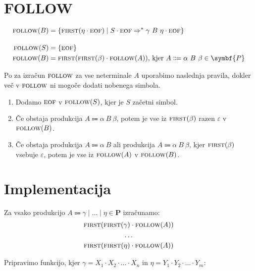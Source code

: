 \documentclass{report}
\newcommand{\Null}{\varepsilon}
\newcommand{\Seq}{\cdot}
\newcommand{\Spc}{\ }
\newcommand{\Union}{\mathrel{|}}
\newcommand{\Set}[1]{\symbf{#1}}
\newcommand{\FIRST}{\textsc{first}}
\newcommand{\FOLLOW}{\textsc{follow}}
\newcommand{\EOF}{\textsc{eof}}
\newcommand{\Productions}{\Set{P}}
\newcommand{\Arrow}{\Coloneq}
\newlength{\arrow}
\newcommand{\DeriveStar}{\Rightarrow^\ast}
\newcommand{\NT}[1]{{#1}}
\newcommand{\Sym}[1]{{#1}}
\begin{document}
\section{FOLLOW}
\begin{tcolorbox}[title={Definicija}]
  \begin{equation*}
    \begin{aligned}
      \FOLLOW(\NT{B}) &= \{ \FIRST(\eta \Seq \EOF) \mid \NT{S} \Seq \EOF \DeriveStar \gamma \Spc \NT{B} \Spc \eta \Seq \EOF \}\\[1em]
      \FOLLOW(\NT{S}) &= \{\EOF\}\\
      \FOLLOW(\NT{B}) &= \FIRST(\FIRST(\beta) \Seq \FOLLOW(\NT{A}))\text{, kjer } \NT{A} \Arrow \alpha \Spc \NT{B} \Spc \beta \in \Productions
    \end{aligned}
  \end{equation*}
\end{tcolorbox}

Po \cite{dragonbook} za izračun $\FOLLOW$ za vse neterminale $\NT{A}$ uporabimo naslednja pravila, dokler več v $\FOLLOW$ ni mogoče dodati nobenega simbola.
\begin{enumerate}
  \item Dodamo $\EOF$ v $\FOLLOW(\NT{S})$, kjer je $\NT{S}$ začetni simbol.
  \item Če obstaja produkcija $\NT{A} \Arrow \alpha \Spc \NT{B} \Spc \beta$, potem je vse iz $\FIRST(\beta)$ razen $\Null$ v $\FOLLOW(\NT{B})$.
  \item Če obstaja produkcija $\NT{A} \Arrow \alpha \Spc \NT{B}$ ali produkcija $\NT{A} \Arrow \alpha \Spc \NT{B} \Spc \beta$, kjer $\FIRST(\beta)$ vsebuje $\Null$, potem je vse iz $\FOLLOW(\NT{A})$ v $\FOLLOW(\NT{B})$.
\end{enumerate}

\section{Implementacija}
Za vsako produkcijo $\NT{A} \Arrow \gamma \Union \dots \Union \eta \in \Productions$ izračunamo:
\begin{gather*}
  \FIRST(\FIRST(\gamma) \Seq \FOLLOW(\NT{A}))\\
  \dots\\
  \FIRST(\FIRST(\eta) \Seq \FOLLOW(\NT{A}))
\end{gather*}

Pripravimo funkcijo, kjer $\gamma = \Sym{X}_1 \Seq \Sym{X}_2 \Seq \dots \Seq \Sym{X}_n$ in $\eta = \Sym{Y}_1 \Seq \Sym{Y}_2 \Seq \dots \Seq \Sym{Y}_m$:
\end{document}
